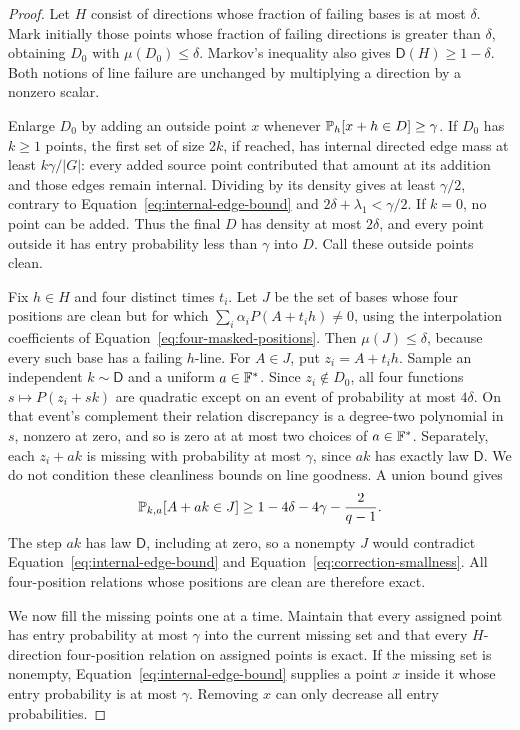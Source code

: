 \begin{proof}
Let $H$ consist of directions whose fraction of failing bases is at
most $\delta$. Mark initially those points whose fraction of failing
directions is greater than $\delta$, obtaining $D_0$ with
$\mu(D_0)\leq\delta$. Markov's inequality also gives
$\mathsf D(H)\geq1-\delta$. Both notions of line failure are unchanged
by multiplying a direction by a nonzero scalar.

Enlarge $D_0$ by adding an outside point $x$ whenever
$\mathbb P_h[x+h\in D]\geq\gamma$. If $D_0$ has $k\geq1$ points, the
first set of size $2k$, if reached, has internal directed edge mass
at least $k\gamma/|G|$: every added source point contributed that
amount at its addition and those edges remain internal. Dividing by
its density gives at least $\gamma/2$, contrary to
Equation~\ref{eq:internal-edge-bound} and
$2\delta+\lambda_1<\gamma/2$. If $k=0$, no point can be added.
Thus the final $D$ has density at most $2\delta$, and every point
outside it has entry probability less than $\gamma$ into $D$.
Call these outside points clean.

Fix $h\in H$ and four distinct times $t_i$. Let $J$ be the set of
bases whose four positions are clean but for which
$\sum_i\alpha_iP(A+t_i h)\ne0$, using the interpolation coefficients
of Equation~\ref{eq:four-masked-positions}. Then $\mu(J)\leq\delta$,
because every such base has a failing $h$-line. For $A\in J$, put
$z_i=A+t_i h$. Sample an independent $k\sim\mathsf D$ and a uniform
$a\in\mathbb F^*$. Since $z_i\notin D_0$, all four functions
$s\mapsto P(z_i+sk)$ are quadratic except on an event of probability
at most $4\delta$. On that event's complement their relation
discrepancy is a degree-two polynomial in $s$, nonzero at zero, and
so is zero at at most two choices of $a\in\mathbb F^*$.
Separately, each $z_i+ak$ is missing with probability at most
$\gamma$, since $ak$ has exactly law $\mathsf D$. We do not condition
these cleanliness bounds on line goodness. A union bound gives
\[
 \mathbb P_{k,a}[A+ak\in J]\geq
 1-4\delta-4\gamma-\frac2{q-1}.
\]
The step $ak$ has law $\mathsf D$, including at zero, so a nonempty
$J$ would contradict Equation~\ref{eq:internal-edge-bound} and
Equation~\ref{eq:correction-smallness}. All four-position relations
whose positions are clean are therefore exact.

We now fill the missing points one at a time. Maintain that every
assigned point has entry probability at most $\gamma$ into the
current missing set and that every $H$-direction four-position
relation on assigned points is exact. If the missing set is
nonempty, Equation~\ref{eq:internal-edge-bound} supplies a point $x$
inside it whose entry probability is at most $\gamma$. Removing $x$
can only decrease all entry probabilities.


\end{proof}
